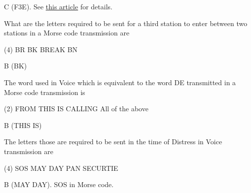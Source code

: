 \documentclass[a4paper]{article}
\begin{document}
\begin{solution}
	C (F3E). See \href{https://en.wikipedia.org/wiki/Types_of_radio_emissions}{this article} for details.
\end{solution}

\vspace{5mm}


\begin{question}What are the letters required to be sent for a third station to enter between two stations in a Morse code transmission are \spaces
	\begin{tasks}(4)
		\task BR
		\task BK
		\task BREAK
		\task BN
	\end{tasks}
\end{question}

\begin{solution}
	B (BK)
\end{solution}

\vspace{5mm}



\begin{question}The word used in Voice which is equivalent to the word \apostrophe{}DE\apostrophe{} transmitted in a Morse code transmission is \spaces
	\begin{tasks}(2)
		\task FROM
		\task THIS IS
		\task CALLING
		\task All of the above
	\end{tasks}
\end{question}

\begin{solution}
	B (THIS IS)
\end{solution}

\vspace{5mm}



\begin{question}The letters those are required to be sent in the time of Distress in Voice transmission are \spaces
	\begin{tasks}(4)
		\task SOS
		\task MAY DAY
		\task PAN
		\task SECURTIE
	\end{tasks}
\end{question}

\begin{solution}
	B (MAY DAY). SOS in Morse code.
\end{solution}

\vspace{5mm}
\end{document}
